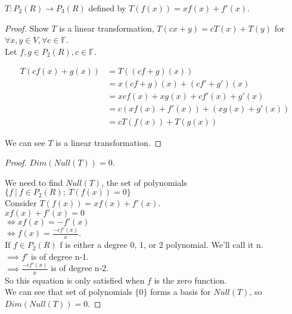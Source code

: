 \documentclass[12pt]{article}
\newenvironment{exercise}[2][Exercise]{\begin{trivlist}
\item[\hskip \labelsep{\bfseries #1}\hskip \labelsep{\bfseries #2.}]}{\end{trivlist}}
\begin{document}
\begin{exercise}{2.1.5} $T: P_2(R) \to P_3(R)$ defined by $T(f(x)) = xf(x) + f'(x)$.

    \begin{proof} Show $T$ is a linear transformation, $T(cx + y) = cT(x) + T(y)$ for $\forall x, y \in V, \forall c \in \mathbb{F}$. \\

        \noindent Let $f, g \in P_2(R), c \in \mathbb{F}$.

        \begin{align*}
            T(cf(x) + g(x)) 
            & = T((cf + g)(x)) \\
            & = x(cf + g)(x) + (cf' + g')(x) \\
            & = xcf(x) + xg(x) + cf'(x) + g'(x) \\
            & = c(xf(x) + f'(x)) + (xg(x) + g'(x)) \\
            & = cT(f(x)) + T(g(x))
        \end{align*}

        \noindent We can see $T$ is a linear transformation.

    \end{proof}

    \begin{proof} $Dim(Null(T)) = 0$.

        \noindent We need to find $Null(T)$, the set of polynomials $\{f\ |\ f \in P_2(R);\ T(f(x)) = 0\}$ \\

        \noindent Consider $T(f(x)) = xf(x) + f'(x)$. \\
        $xf(x) + f'(x) = 0$ \\
        $\iff xf(x) = -f'(x)$ \\
        $\iff f(x) = \frac{-cf'(x)}{x}$. \\
        If $f \in P_2(R)$ f is either a degree 0, 1, or 2 polynomial. We'll call it n. \\
        $\implies f'$ is of degree n-1. \\
        $\implies \frac{-cf'(x)}{x}$ is of degree n-2. \\
        So this equation is only satisfied when $f$ is the zero function. \\
        We can see that set of polynomials $\{0\}$ forms a basis for $Null(T)$, so $Dim(Null(T)) = 0$.

    \end{proof}


\end{exercise}
\end{document}
